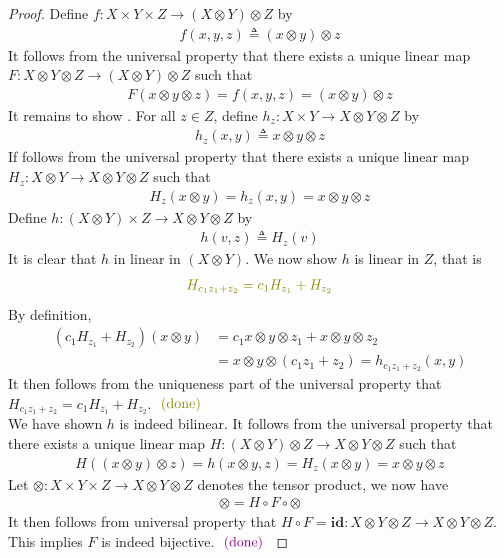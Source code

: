 \documentclass{report}
\begin{document}
\begin{proof}
Define $f:X\times Y \times Z\rightarrow (X\otimes  Y)\otimes Z$ by 
\begin{align*}
f(x,y,z)\triangleq (x \otimes  y)\otimes z
\end{align*}
It follows from the universal property that there exists a unique linear map $F:X\otimes  Y\otimes Z\rightarrow (X \otimes  Y)\otimes  Z $ such that 
\begin{align*}
F(x\otimes  y\otimes  z)=f(x,y,z)= (x \otimes y) \otimes z 
\end{align*}
It remains to show .  For all $z\in Z$, define $h_z:X\times Y\rightarrow X \otimes  Y\otimes Z$ by 
\begin{align*}
h_z(x,y)\triangleq x\otimes  y\otimes  z
\end{align*}
If follows from the universal property that there exists a unique linear map $H_z:X\otimes  Y \rightarrow X \otimes  Y\otimes  Z$ such that 
\begin{align*}
H_z(x \otimes  y)=h_z(x,y)=x \otimes  y \otimes  z
\end{align*}
Define $h:(X\otimes  Y)\times Z\rightarrow X\otimes Y \otimes Z$ by 
\begin{align*}
h(v,z)\triangleq H_z(v)
\end{align*}
It is clear that $h$ in linear in  $(X\otimes  Y)$. We now show $h$ is linear in  $Z$, that is 
 \begin{align*}
   \olive{H_{c_1z_1+z_2}=c_1H_{z_1}+H_{z_2}}
\end{align*}
By definition, 
\begin{align*}
  (c_1H_{z_1}+H_{z_2})(x\otimes  y)&=c_1 x\otimes  y\otimes  z_1+ x\otimes  y \otimes  z_2\\
  &= x\otimes  y\otimes  (c_1z_1+z_2)=h_{c_1z_1+z_2}(x,y)
\end{align*}
It then follows from the uniqueness part of the universal property that $H_{c_1z_1+z_2}=c_1H_{z_1}+H_{z_2}$. $\odone$  \\


We have shown $h$ is indeed bilinear. It follows from the universal property that there exists a unique linear map $H:(X\otimes  Y)\otimes  Z\rightarrow X\otimes Y\otimes Z$ such that 
\begin{align*}
H((x\otimes y)\otimes z)=h(x\otimes  y,z)=H_z(x\otimes  y)=x\otimes  y\otimes  z
\end{align*}
Let $\otimes:X\times Y\times Z\rightarrow X\otimes  Y\otimes  Z$ denotes the tensor product, we now have 
\begin{align*}
\otimes = H \circ F \circ \otimes 
\end{align*}
It then follows from universal property that $H \circ F=\textbf{id}:X\otimes  Y\otimes  Z\rightarrow X\otimes  Y\otimes  Z$. This implies $F$ is indeed bijective. $\textcolor{violet}{\text{ (done) }}$
\end{proof}
\end{document}

